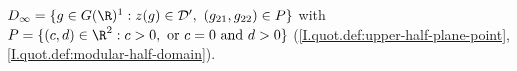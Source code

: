 $D_\infty=\{g\in G(\R)^1:z(g)\in\mathcal D',\ (g_{21},g_{22})\in P\}$ with $P=\{(c,d)\in\R^2:c>0,\text{ or }c=0\text{ and }d>0\}$ (\cref{I.quot.def:upper-half-plane-point}, \cref{I.quot.def:modular-half-domain}).
